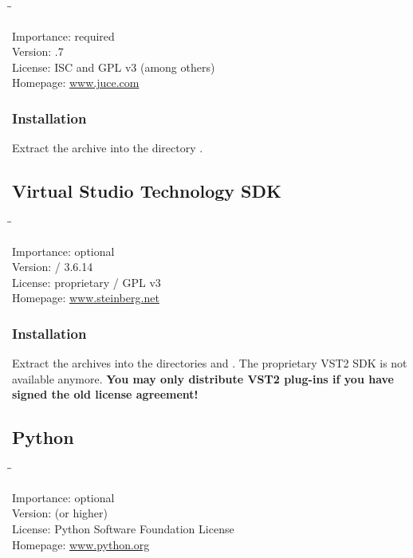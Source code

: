 \begin{tabbing}
  \hspace*{6em}\=\=\kill

  Importance:  \> required \\
  Version:     .7 \\
  License:     \> ISC and GPL v3 (among others) \\
  Homepage:    \> \href{http://www.juce.com/}{www.juce.com}
\end{tabbing}

\subsubsection{Installation}

Extract the archive into the directory .

\subsection{Virtual Studio Technology SDK}

\begin{tabbing}
  \hspace*{6em}\=\=\kill

  Importance:  \> optional \\
  Version:      / 3.6.14 \\
  License:     \> proprietary / GPL v3 \\
  Homepage:    \> \href{http://www.steinberg.net/en/company/developer.html}{www.steinberg.net}
\end{tabbing}

\subsubsection{Installation}

Extract the archives into the directories  and
.  The proprietary VST2 SDK is not available
anymore.  \textbf{You may only distribute VST2 plug-ins if you have
  signed the old license agreement!}

\subsection{Python}

\begin{tabbing}
  \hspace*{6em}\=\=\kill

  Importance:  \> optional \\
  Version:      (or higher) \\
  License:     \> Python Software Foundation License \\
  Homepage:    \> \href{http://www.python.org/}{www.python.org}
\end{tabbing}

